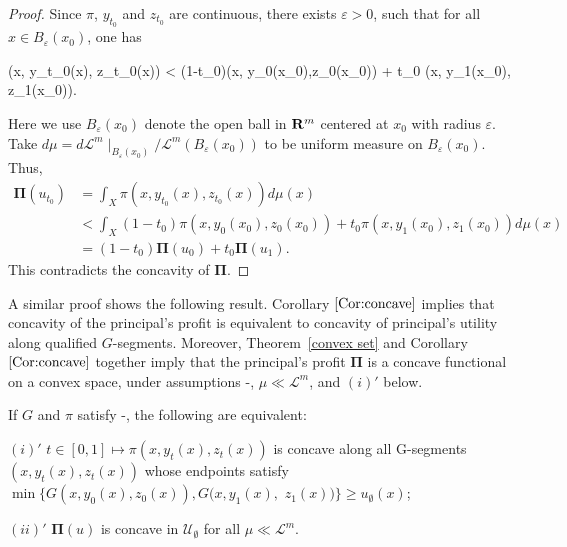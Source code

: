 \begin{proof}
	Since $\pi$, $y_{t_0}$ and $z_{t_0}$ are continuous, there exists $\varepsilon >0$, such that for all $x\in B_{\varepsilon}(x_0)$, one has
	\begin{flalign*}
	\pi(x, y_{t_0}(x), z_{t_0}(x)) < (1-t_0)\pi(x, y_0(x_0),z_0(x_0))  + t_0 \pi(x, y_1(x_0), z_1(x_0)).
	\end{flalign*} 
	Here we use $B_{\varepsilon}(x_0)$ denote the open ball in ${\mathbf R}^m$ centered at $x_0$ with radius $\varepsilon$.
	Take $d\mu = d\mathcal{L}^m
	\mid _{B_{\varepsilon} (x_0)}/{\mathcal{L}^m} 
	(B_{\varepsilon}(x_0))$ to be uniform measure on $B_\varepsilon(x_0)$. 
	Thus, 
	\begin{align*}
	\pmb \Pi (u_{t_0}) &= \int_X \pi(x, y_{t_0}(x), z_{t_0}(x)) d\mu(x)\\
	&<  \int_X    (1-t_0)\pi(x, y_0(x_0),z_0(x_0))  + t_0 \pi(x, y_1(x_0), z_1(x_0))     d\mu(x)\\
	&=(1-t_0)\pmb \Pi(u_0)+ t_0 \pmb \Pi(u_1).
	\end{align*}
	This contradicts the concavity of $\pmb \Pi$.
\end{proof}

A similar proof shows the following result. Corollary $\ref{Cor:concave}$ implies that concavity of the principal's profit is equivalent to concavity of principal's utility along qualified $G$-segments. Moreover, Theorem~\ref{convex set} and Corollary $\ref{Cor:concave}$ together imply that the principal's profit $\pmb \Pi$ is a concave functional on a convex space, under assumptions \Gzero-\Gfive, $\mu\ll \mathcal{L}^m$, and $(i)'$ below. 
\medskip

\begin{corollary}\label{Cor:concave}
	If $G$ and $\pi$ satisfy \Gzero-\Gfive,  the following are equivalent:
	
	$(i)'$ $t\in[0,1] \longmapsto \pi(x, y_t(x) ,z_t(x))$ is concave  along all G-segments $(x, y_t(x), z_t(x))$ whose 
	endpoints satisfy $\min\{G(x, y_0(x), z_0(x)),G(x,y_1(x),$
	$z_1(x))\} \ge u_{\emptyset}(x)$;
	
	$(ii)'$ $\pmb \Pi(u)$ is concave in $\mathcal{U}_{\emptyset}$  for all $\mu\ll \mathcal{L}^m$. 
\end{corollary}




